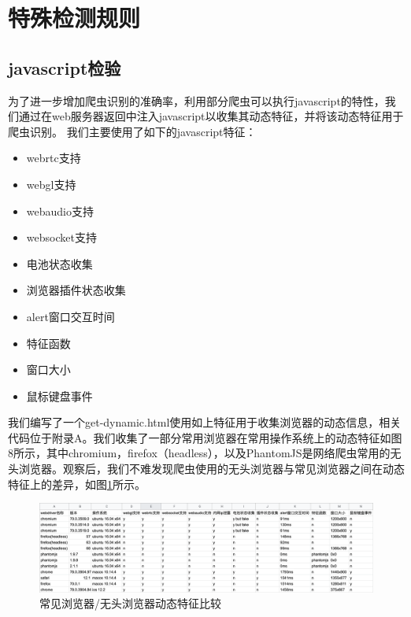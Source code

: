 \documentclass[doctor,privacy,twoside]{buaa_mac}
\begin{document}
\section{特殊检测规则}
\subsection{javascript检验}

为了进一步增加爬虫识别的准确率，利用部分爬虫可以执行javascript的特性，我们通过在web服务器返回中注入javascript以收集其动态特征，并将该动态特征用于爬虫识别。
我们主要使用了如下的javascript特征：

\begin{itemize}
\item webrtc支持
\item webgl支持
\item webaudio支持
\item websocket支持
\item 电池状态收集
\item 浏览器插件状态收集
\item alert窗口交互时间
\item 特征函数
\item 窗口大小
\item 鼠标键盘事件
\end{itemize}

我们编写了一个get-dynamic.html使用如上特征用于收集浏览器的动态信息，相关代码位于附录A。我们收集了一部分常用浏览器在常用操作系统上的动态特征如图8所示，其中chromium，firefox（headless），以及PhantomJS是网络爬虫常用的无头浏览器。观察后，我们不难发现爬虫使用的无头浏览器与常见浏览器之间在动态特征上的差异，如图\ref{fig:dynamic}所示。

\centerline{}
\begin{figure}[!h]
  \centering
  \includegraphics[width=1\textwidth]{images/dynamic_features.png}
  \caption{常见浏览器/无头浏览器动态特征比较}
  \label{fig:dynamic}
\end{figure}
\end{document}
